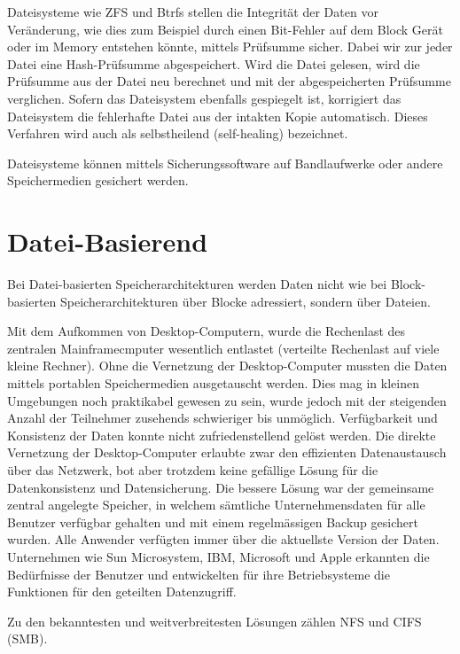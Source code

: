 Dateisysteme wie ZFS und Btrfs stellen die Integrität der Daten vor Veränderung, wie dies zum Beispiel durch einen Bit-Fehler auf dem Block Gerät oder im Memory entstehen könnte, mittels Prüfsumme sicher. Dabei wir zur jeder Datei eine Hash-Prüfsumme abgespeichert. Wird die Datei gelesen, wird die Prüfsumme aus der Datei neu berechnet und mit der abgespeicherten Prüfsumme verglichen. Sofern das Dateisystem ebenfalls gespiegelt ist, korrigiert das Dateisystem die fehlerhafte Datei aus der intakten Kopie automatisch. Dieses Verfahren wird auch als selbstheilend (self-healing) bezeichnet. \cite{Bonwick2005}\cite{Oracle}

Dateisysteme können mittels Sicherungssoftware auf Bandlaufwerke oder andere Speichermedien gesichert werden.


\section{Datei-Basierend}
Bei Datei-basierten Speicherarchitekturen werden Daten nicht wie bei Block-basierten Speicherarchitekturen über Blocke adressiert, sondern über Dateien.

Mit dem Aufkommen von Desktop-Computern, wurde die Rechenlast des zentralen Mainframecmputer wesentlich entlastet (verteilte Rechenlast auf viele kleine Rechner). Ohne die Vernetzung der Desktop-Computer mussten die Daten mittels portablen Speichermedien ausgetauscht werden. Dies mag in kleinen Umgebungen noch praktikabel gewesen zu sein, wurde jedoch mit der steigenden Anzahl der Teilnehmer zusehends schwieriger bis unmöglich. Verfügbarkeit und Konsistenz der Daten konnte nicht zufriedenstellend gelöst werden. Die direkte Vernetzung der Desktop-Computer erlaubte zwar den effizienten Datenaustausch über das Netzwerk, bot aber trotzdem keine gefällige Lösung für die Datenkonsistenz und Datensicherung. Die bessere Lösung war der gemeinsame zentral angelegte Speicher, in welchem sämtliche Unternehmensdaten für alle Benutzer verfügbar gehalten und mit einem regelmässigen Backup gesichert wurden. Alle Anwender verfügten immer über die aktuellste Version der Daten. Unternehmen wie Sun Microsystem, IBM, Microsoft und Apple erkannten die Bedürfnisse der Benutzer und entwickelten für ihre Betriebsysteme die Funktionen für den geteilten Datenzugriff.

Zu den bekanntesten und weitverbreitesten Lösungen zählen NFS und \gls{CIFS} (SMB).



